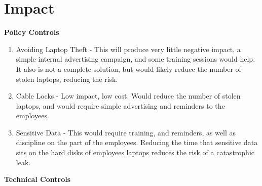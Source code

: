 \documentclass{article}
\numberwithin{equation}{section} %
\numberwithin{figure}{section} %
\numberwithin{table}{section} %
\begin{document}
\section{Impact}
\label{sec:impact}
	\textbf{Policy Controls}
	\begin{enumerate}
		\item Avoiding Laptop Theft - This will produce very little negative impact, a simple internal advertising campaign, and some training sessions would help.  It also is not a complete solution, but would likely reduce the number of stolen laptops, reducing the risk.
		\item Cable Locks - Low impact, low cost.  Would reduce the number of stolen laptops, and would require simple advertising and reminders to the employees.
		\item Sensitive Data - This would require training, and reminders, as well as discipline on the part of the employees. Reducing the time that sensitive data sits on the hard disks of employees laptops reduces the risk of a catastrophic leak.
	\end{enumerate}
	\textbf{Technical Controls}
\end{document}
